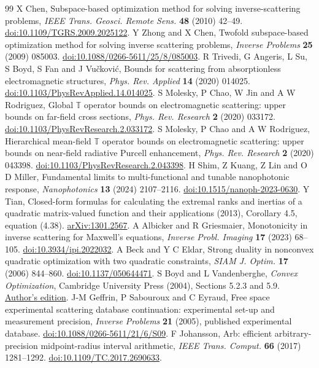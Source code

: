 \documentclass[anonymous,12pt]{iopjournal}
\theoremstyle{remark}\newtheorem{remark}[theorem]{Remark}
\numberwithin{equation}{section}
\begin{document}
\begin{thebibliography}{99}\setlength{\itemsep}{1pt}\setlength{\parsep}{0pt}
 X Chen, Subspace-based optimization method for solving inverse-scattering problems, \emph{IEEE Trans. Geosci. Remote Sens.} \textbf{48} (2010) 42--49. \href{https://doi.org/10.1109/TGRS.2009.2025122}{doi:10.1109/TGRS.2009.2025122}.
 Y Zhong and X Chen, Twofold subspace-based optimization method for solving inverse scattering problems, \emph{Inverse Problems} \textbf{25} (2009) 085003. \href{https://doi.org/10.1088/0266-5611/25/8/085003}{doi:10.1088/0266-5611/25/8/085003}.
 R Trivedi, G Angeris, L Su, S Boyd, S Fan and J Vu\v{c}kovi\'c, Bounds for scattering from absorptionless electromagnetic structures, \emph{Phys. Rev. Applied} \textbf{14} (2020) 014025. \href{https://doi.org/10.1103/PhysRevApplied.14.014025}{doi:10.1103/PhysRevApplied.14.014025}.
 S Molesky, P Chao, W Jin and A W Rodriguez, Global $\mathbb T$ operator bounds on electromagnetic scattering: upper bounds on far-field cross sections, \emph{Phys. Rev. Research} \textbf{2} (2020) 033172. \href{https://doi.org/10.1103/PhysRevResearch.2.033172}{doi:10.1103/PhysRevResearch.2.033172}.
 S Molesky, P Chao and A W Rodriguez, Hierarchical mean-field $\mathbb T$ operator bounds on electromagnetic scattering: upper bounds on near-field radiative Purcell enhancement, \emph{Phys. Rev. Research} \textbf{2} (2020) 043398. \href{https://doi.org/10.1103/PhysRevResearch.2.043398}{doi:10.1103/PhysRevResearch.2.043398}.
 H Shim, Z Kuang, Z Lin and O D Miller, Fundamental limits to multi-functional and tunable nanophotonic response, \emph{Nanophotonics} \textbf{13} (2024) 2107--2116. \href{https://doi.org/10.1515/nanoph-2023-0630}{doi:10.1515/nanoph-2023-0630}.
 Y Tian, Closed-form formulas for calculating the extremal ranks and inertias of a quadratic matrix-valued function and their applications (2013), Corollary 4.5, equation (4.38). \href{https://arxiv.org/abs/1301.2567}{arXiv:1301.2567}.
 A Albicker and R Griesmaier, Monotonicity in inverse scattering for Maxwell's equations, \emph{Inverse Probl. Imaging} \textbf{17} (2023) 68--105. \href{https://doi.org/10.3934/ipi.2022032}{doi:10.3934/ipi.2022032}.
 A Beck and Y C Eldar, Strong duality in nonconvex quadratic optimization with two quadratic constraints, \emph{SIAM J. Optim.} \textbf{17} (2006) 844--860. \href{https://doi.org/10.1137/050644471}{doi:10.1137/050644471}.
 S Boyd and L Vandenberghe, \emph{Convex Optimization}, Cambridge University Press (2004), Sections 5.2.3 and 5.9. \href{https://web.stanford.edu/~boyd/cvxbook/}{Author's edition}.
 J-M Geffrin, P Sabouroux and C Eyraud, Free space experimental scattering database continuation: experimental set-up and measurement precision, \emph{Inverse Problems} \textbf{21} (2005), published experimental database. \href{https://doi.org/10.1088/0266-5611/21/6/S09}{doi:10.1088/0266-5611/21/6/S09}.
 F Johansson, Arb: efficient arbitrary-precision midpoint-radius interval arithmetic, \emph{IEEE Trans. Comput.} \textbf{66} (2017) 1281--1292. \href{https://doi.org/10.1109/TC.2017.2690633}{doi:10.1109/TC.2017.2690633}.
\end{thebibliography}
\end{document}
